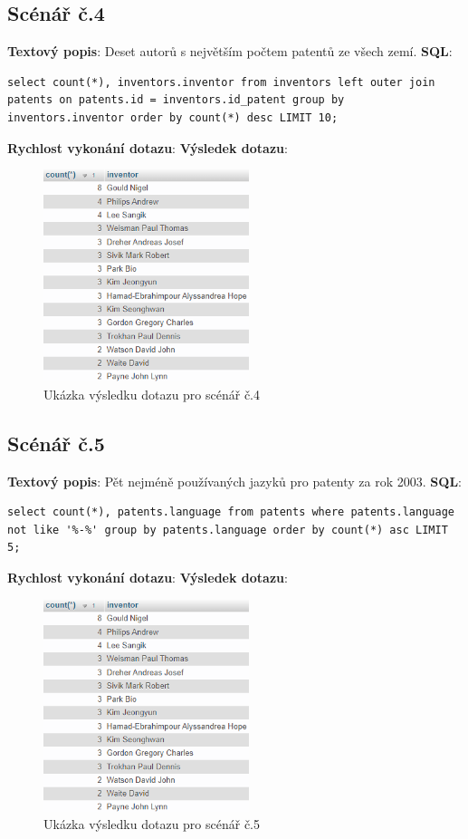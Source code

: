 \subsection{Scénář č.4}
\textbf{Textový popis}: Deset autorů s největším počtem patentů ze všech zemí.
\newline
\textbf{SQL}: 
\begin{lstlisting}[label = {lst:elements_a}]
select count(*), inventors.inventor from inventors left outer join patents on patents.id = inventors.id_patent group by inventors.inventor order by count(*) desc LIMIT 10;
\end{lstlisting}
\textbf{Rychlost vykonání dotazu}: 
\newline
\textbf{Výsledek dotazu}:
\begin{figure}[H]
\centering
\includegraphics[width=6cm]{img/scenare/scenar_9}
\caption{Ukázka výsledku dotazu pro scénář č.4}
\label{fig:scenar4}
\end{figure}

\subsection{Scénář č.5}
\textbf{Textový popis}: Pět nejméně používaných jazyků pro patenty za rok 2003.
\newline
\textbf{SQL}: 
\begin{lstlisting}[label = {lst:elements_a}]
select count(*), patents.language from patents where patents.language not like '%-%' group by patents.language order by count(*) asc LIMIT 5;
\end{lstlisting}
\textbf{Rychlost vykonání dotazu}: 
\newline
\textbf{Výsledek dotazu}:
\begin{figure}[H]
\centering
\includegraphics[width=6cm]{img/scenare/scenar_9}
\caption{Ukázka výsledku dotazu pro scénář č.5}
\label{fig:scenar5}
\end{figure}

